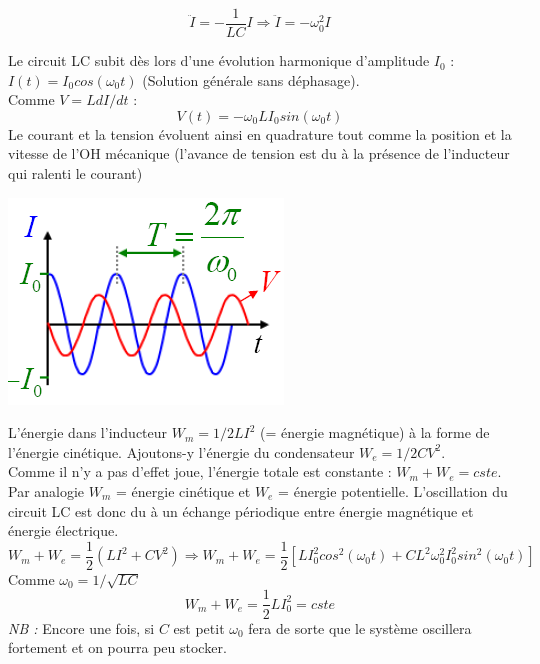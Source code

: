 \documentclass	[11pt, a4paper, openany]{book}
\begin{document}
\begin{equation}
\ddot{I} = -\frac{1}{LC}I \Rightarrow \ddot{I} = -\omega_0^2I
\end{equation}

Le circuit LC subit dès lors d'une évolution harmonique d'amplitude $I_0$ : $I(t) = I_0 cos(\omega_0 t)$ (Solution générale sans déphasage).\\
Comme $V = LdI/dt$ :
\begin{equation}
V(t) = -\omega_0LI_0sin(\omega_0 t)
\end{equation}
Le courant et la tension évoluent ainsi en quadrature tout comme la position et la vitesse de l'OH mécanique (l'avance de tension est du à la présence de l'inducteur qui ralenti le courant)
\begin{center}
\includegraphics[scale=0.45]{oo/image6.png}
\end{center}
L'énergie dans l'inducteur $W_m = 1/2LI^2$ (= énergie magnétique) à la forme de l'énergie cinétique. Ajoutons-y l'énergie du condensateur $W_e = 1/2CV^2$.\\
Comme il n'y a pas d'effet joue, l'énergie totale est constante : $W_m + W_e = cste$.\\

Par analogie $W_m$ = énergie cinétique et $W_e$ = énergie potentielle. L'oscillation du circuit LC est donc du à un échange périodique entre énergie magnétique et énergie électrique.
\begin{equation}
W_m + W_e = \frac{1}{2}(LI^2 + CV^2) \Rightarrow W_m + W_e = \frac{1}{2}\left[LI_0^2cos^2(\omega_0 t) + CL^2\omega_0^2I^2_0sin^2(\omega_0 t)\right]
\end{equation}
Comme $\omega_0 = 1/\sqrt{LC}$
\begin{equation}
W_m + W_e = \frac{1}{2}LI^2_0 = cste
\end{equation}
\textit{NB :} Encore une fois, si $C$ est petit $\omega_0$ fera de sorte que le système oscillera fortement et on pourra peu stocker.
\end{document}
